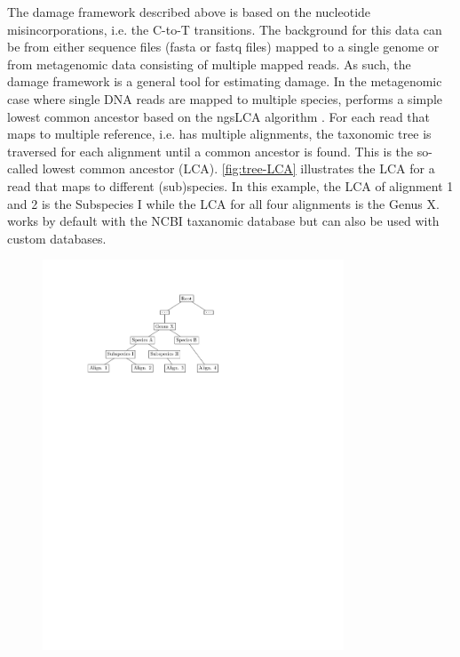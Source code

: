 The damage framework described above is based on the nucleotide misincorporations, i.e. the C-to-T transitions. The background for this data can be from either sequence files (fasta or fastq files) mapped to a single genome or from metagenomic data consisting of multiple mapped reads. As such, the damage framework is a general tool for estimating damage.
In the metagenomic case where single DNA reads are mapped to multiple species, \metaDMG performs a simple lowest common ancestor based on the ngsLCA algorithm \autocite{wangNgsLCAToolkitFasta}. For each read that maps to multiple reference, i.e. has multiple alignments, the taxonomic tree is traversed for each alignment until a common ancestor is found. This is the so-called lowest common ancestor (LCA). \autoref{fig:tree-LCA} illustrates the LCA for a read that maps to different (sub)species. In this example, the LCA of alignment 1 and 2 is the Subspecies I while the LCA for all four alignments is the Genus X. \metaDMG works by default with the NCBI taxanomic database but can also be used with custom databases.

\begin{figure}[htbp]
    \centering
    \includegraphics[trim={3cm 19.5cm 8.5cm 2.3cm}, clip, width=0.8\textwidth]{figures/tree.pdf}
\end{figure}

